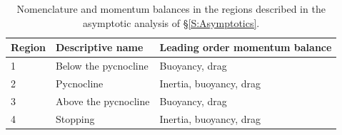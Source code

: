 \documentclass[openacc]{rsproca_new}%
\begin{document}
\begin{table}[h!]
\caption{Nomenclature and momentum balances in the regions described in the asymptotic analysis of \S\ref{S:Asymptotics}.}
\label{T:Balances}
\begin{center}
\begin{tabular}{lll}
  Region  & Descriptive name & Leading order momentum balance    \\ \hline
   1  & Below the pycnocline & Buoyancy, drag \\
   2  & Pycnocline & Inertia, buoyancy, drag \\
   3  & Above the pycnocline & Buoyancy, drag \\
   4  & Stopping & Inertia,  buoyancy, drag
\end{tabular}
\end{center}
\vspace{-4pt}
\end{table}
\end{document}
